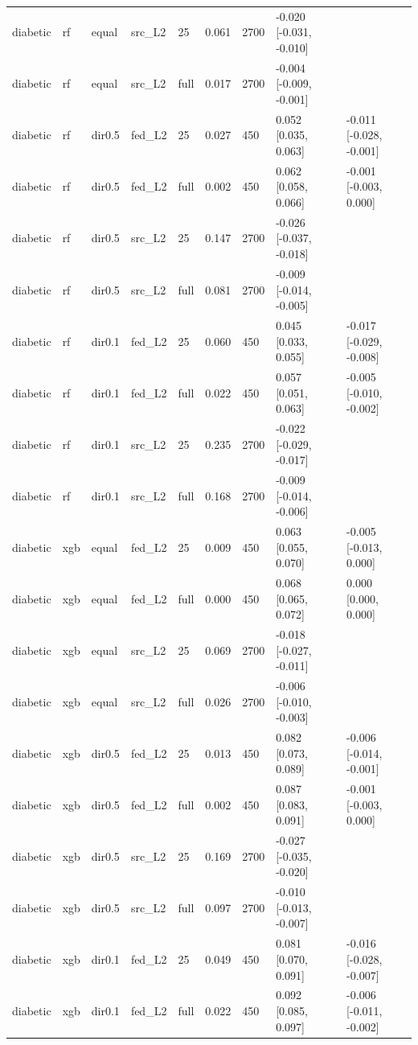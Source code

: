 \begin{tabular}{lllllllll}
diabetic & rf & equal & src\_L2 & 25 & 0.061 & 2700 & -0.020 [-0.031, -0.010] &  \\
diabetic & rf & equal & src\_L2 & full & 0.017 & 2700 & -0.004 [-0.009, -0.001] &  \\
diabetic & rf & dir0.5 & fed\_L2 & 25 & 0.027 & 450 & 0.052 [0.035, 0.063] & -0.011 [-0.028, -0.001] \\
diabetic & rf & dir0.5 & fed\_L2 & full & 0.002 & 450 & 0.062 [0.058, 0.066] & -0.001 [-0.003, 0.000] \\
diabetic & rf & dir0.5 & src\_L2 & 25 & 0.147 & 2700 & -0.026 [-0.037, -0.018] &  \\
diabetic & rf & dir0.5 & src\_L2 & full & 0.081 & 2700 & -0.009 [-0.014, -0.005] &  \\
diabetic & rf & dir0.1 & fed\_L2 & 25 & 0.060 & 450 & 0.045 [0.033, 0.055] & -0.017 [-0.029, -0.008] \\
diabetic & rf & dir0.1 & fed\_L2 & full & 0.022 & 450 & 0.057 [0.051, 0.063] & -0.005 [-0.010, -0.002] \\
diabetic & rf & dir0.1 & src\_L2 & 25 & 0.235 & 2700 & -0.022 [-0.029, -0.017] &  \\
diabetic & rf & dir0.1 & src\_L2 & full & 0.168 & 2700 & -0.009 [-0.014, -0.006] &  \\
diabetic & xgb & equal & fed\_L2 & 25 & 0.009 & 450 & 0.063 [0.055, 0.070] & -0.005 [-0.013, 0.000] \\
diabetic & xgb & equal & fed\_L2 & full & 0.000 & 450 & 0.068 [0.065, 0.072] & 0.000 [0.000, 0.000] \\
diabetic & xgb & equal & src\_L2 & 25 & 0.069 & 2700 & -0.018 [-0.027, -0.011] &  \\
diabetic & xgb & equal & src\_L2 & full & 0.026 & 2700 & -0.006 [-0.010, -0.003] &  \\
diabetic & xgb & dir0.5 & fed\_L2 & 25 & 0.013 & 450 & 0.082 [0.073, 0.089] & -0.006 [-0.014, -0.001] \\
diabetic & xgb & dir0.5 & fed\_L2 & full & 0.002 & 450 & 0.087 [0.083, 0.091] & -0.001 [-0.003, 0.000] \\
diabetic & xgb & dir0.5 & src\_L2 & 25 & 0.169 & 2700 & -0.027 [-0.035, -0.020] &  \\
diabetic & xgb & dir0.5 & src\_L2 & full & 0.097 & 2700 & -0.010 [-0.013, -0.007] &  \\
diabetic & xgb & dir0.1 & fed\_L2 & 25 & 0.049 & 450 & 0.081 [0.070, 0.091] & -0.016 [-0.028, -0.007] \\
diabetic & xgb & dir0.1 & fed\_L2 & full & 0.022 & 450 & 0.092 [0.085, 0.097] & -0.006 [-0.011, -0.002] \\

\end{tabular}
